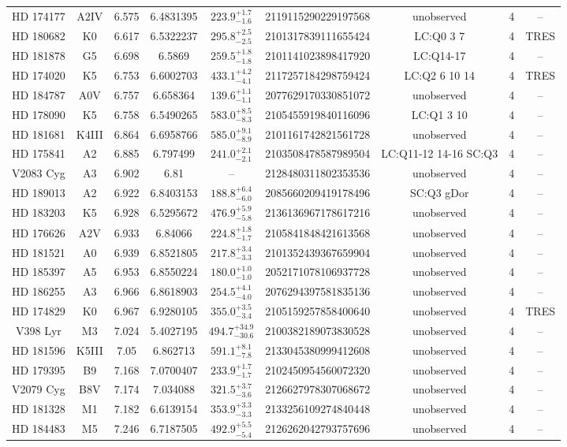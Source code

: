 \begin{table*}
\begin{tabular}{ccccccccc}
HD 174177 & A2IV & 6.575 & 6.4831395 & $223.9^{+1.7}_{-1.6}$ & 2119115290229197568 & unobserved & 4 & -- \\
HD 180682 & K0 & 6.617 & 6.5322237 & $295.8^{+2.5}_{-2.5}$ & 2101317839111655424 & LC:Q0 3 7 & 4 & TRES \\
HD 181878 & G5 & 6.698 & 6.5869 & $259.5^{+1.8}_{-1.8}$ & 2101141023898417920 & LC:Q14-17 & 4 & -- \\
HD 174020 & K5 & 6.753 & 6.6002703 & $433.1^{+4.2}_{-4.1}$ & 2117257184298759424 & LC:Q2 6 10 14 & 4 & TRES \\
HD 184787 & A0V & 6.757 & 6.658364 & $139.6^{+1.1}_{-1.1}$ & 2077629170330851072 & unobserved & 4 & -- \\
HD 178090 & K5 & 6.758 & 6.5490265 & $583.0^{+8.5}_{-8.3}$ & 2105455919840116096 & LC:Q1 3 10 & 4 & -- \\
HD 181681 & K4III & 6.864 & 6.6958766 & $585.0^{+9.1}_{-8.9}$ & 2101161742821561728 & unobserved & 4 & -- \\
HD 175841 & A2 & 6.885 & 6.797499 & $241.0^{+2.1}_{-2.1}$ & 2103508478587989504 & LC:Q11-12 14-16 SC:Q3 & 4 & -- \\
V2083 Cyg & A3 & 6.902 & 6.81 & -- & 2128480311802353536 & unobserved & 4 & -- \\
HD 189013 & A2 & 6.922 & 6.8403153 & $188.8^{+6.4}_{-6.0}$ & 2085660209419178496 & SC:Q3 gDor & 4 & -- \\
HD 183203 & K5 & 6.928 & 6.5295672 & $476.9^{+5.9}_{-5.8}$ & 2136136967178617216 & unobserved & 4 & -- \\
HD 176626 & A2V & 6.933 & 6.84066 & $224.8^{+1.8}_{-1.7}$ & 2105841848421613568 & unobserved & 4 & -- \\
HD 181521 & A0 & 6.939 & 6.8521805 & $217.8^{+3.4}_{-3.3}$ & 2101352439367659904 & unobserved & 4 & -- \\
HD 185397 & A5 & 6.953 & 6.8550224 & $180.0^{+1.0}_{-1.0}$ & 2052171078106937728 & unobserved & 4 & -- \\
HD 186255 & A3 & 6.966 & 6.8618903 & $254.5^{+4.1}_{-4.0}$ & 2076294397581835136 & unobserved & 4 & -- \\
HD 174829 & K0 & 6.967 & 6.9280105 & $355.0^{+3.5}_{-3.4}$ & 2105159257858400640 & unobserved & 4 & TRES \\
V398 Lyr & M3 & 7.024 & 5.4027195 & $494.7^{+34.9}_{-30.6}$ & 2100382189073830528 & unobserved & 4 & -- \\
HD 181596 & K5III & 7.05 & 6.862713 & $591.1^{+8.1}_{-7.8}$ & 2133045380999412608 & unobserved & 4 & -- \\
HD 179395 & B9 & 7.168 & 7.0700407 & $233.9^{+1.7}_{-1.7}$ & 2102450954560072320 & unobserved & 4 & -- \\
V2079 Cyg & B8V & 7.174 & 7.034088 & $321.5^{+3.7}_{-3.6}$ & 2126627978307068672 & unobserved & 4 & -- \\
HD 181328 & M1 & 7.182 & 6.6139154 & $353.9^{+3.3}_{-3.3}$ & 2133256109274840448 & unobserved & 4 & -- \\
HD 184483 & M5 & 7.246 & 6.7187505 & $492.9^{+5.5}_{-5.4}$ & 2126262042793757696 & unobserved & 4 & -- \\
\hline
\end{tabular}
\end{table*}
